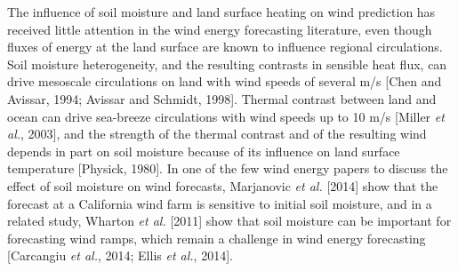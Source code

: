 
The influence of soil moisture and land surface heating on wind prediction has received little attention in the wind energy forecasting literature, even though fluxes of energy at the land surface are known to influence regional circulations.  Soil moisture heterogeneity, and the resulting contrasts in sensible heat flux, can drive mesoscale circulations on land with wind speeds of several m/s [Chen and Avissar, 1994; Avissar and Schmidt, 1998].  Thermal contrast between land and ocean can drive sea-breeze circulations with wind speeds up to 10 m/s [Miller \textit{et al.}, 2003], and the strength of the thermal contrast and of the resulting wind depends in part on soil moisture because of its influence on land surface temperature [Physick, 1980].  In one of the few wind energy papers to discuss the effect of soil moisture on wind forecasts, Marjanovic \textit{et al.} [2014] show that the forecast at a California wind farm is sensitive to initial soil moisture, and in a related study, Wharton \textit{et al.} [2011] show that soil moisture can be important for forecasting wind ramps, which remain a challenge in wind energy forecasting [Carcangiu \textit{et al.}, 2014; Ellis \textit{et al.}, 2014].

